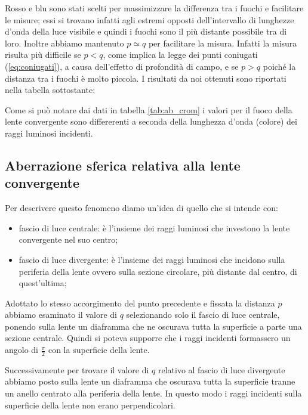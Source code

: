 Rosso e blu sono stati scelti per massimizzare la differenza tra i fuochi e facilitare le misure; essi si trovano infatti agli estremi opposti dell'intervallo di lunghezze d'onda della luce visibile e quindi i fuochi sono il più distante possibile tra di loro. Inoltre abbiamo mantenuto $p \simeq q$ per facilitare la misura. Infatti la misura risulta più difficile se $p < q$, come implica la legge dei punti coniugati (\ref{eq:coniugati}), a causa dell'effetto di profondità di campo, e se $p > q$ poiché la distanza tra i fuochi è molto piccola.
I risultati da noi ottenuti sono riportati nella tabella sottostante:


Come si può notare dai dati in tabella \ref{tab:ab_crom} i valori per il fuoco della lente convergente sono differerenti a seconda della lunghezza d'onda (colore) dei raggi luminosi incidenti.

\subsection{Aberrazione sferica relativa alla lente convergente}

Per descrivere questo fenomeno diamo un'idea di quello che si intende con:
\begin{itemize}
	\item{fascio di luce centrale: è l'insieme dei raggi luminosi che investono la lente convergente nel suo centro;}
	\item{fascio di luce divergente: è l'insieme dei raggi luminosi che incidono sulla periferia della lente ovvero sulla sezione circolare, più distante dal centro, di quest'ultima;}
\end{itemize}

Adottato lo stesso accorgimento del punto precedente e fissata la distanza $p$ abbiamo esaminato il valore di $q$ selezionando solo il fascio di luce centrale, ponendo sulla lente un diaframma che ne oscurava tutta la superficie a parte una sezione centrale. Quindi si poteva supporre che i raggi incidenti formassero un angolo di $\frac{\pi}{2}$ con la superficie della lente.

Successivamente per trovare il valore di $q$ relativo al fascio di luce divergente abbiamo posto sulla lente un diaframma che oscurava tutta la superficie tranne un anello centrato alla periferia della lente. %
In questo modo i raggi incidenti sulla superficie della lente non erano perpendicolari.

